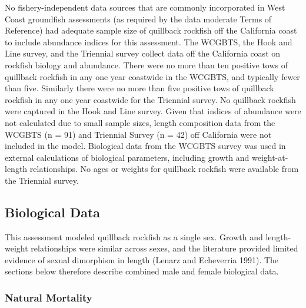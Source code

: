 \documentclass[11pt,
  english,
  a4paper,
]{article}
\begin{document}
No fishery-independent data sources that are commonly incorporated in West Coast groundfish assessments (as required by the data moderate Terms of Reference) had adequate sample size of quillback rockfish off the California coast to include abundance indices for this assessment. The WCGBTS, the Hook and Line survey, and the Triennial survey collect data off the California coast on rockfish biology and abundance. There were no more than ten positive tows of quillback rockfish in any one year coastwide in the WCGBTS, and typically fewer than five. Similarly there were no more than five positive tows of quillback rockfish in any one year coastwide for the Triennial survey. No quillback rockfish were captured in the Hook and Line survey. Given that indices of abundance were not calculated due to small sample sizes, length composition data from the WCGBTS (n = 91) and Triennial Survey (n = 42) off California were not included in the model. Biological data from the WCGBTS survey was used in external calculations of biological parameters, including growth and weight-at-length relationships. No ages or weights for quillback rockfish were available from the Triennial survey.

\leavevmode\tagmcend\tagstructend\par


\hypertarget{biological-data}{%
\subsection{Biological Data}\label{biological-data}}

\leavevmode\tagmcend\tagstructend


This assessment modeled quillback rockfish as a single sex. Growth and length-weight relationships were similar across sexes, and the literature provided limited evidence of sexual dimorphism in length {(Lenarz and Echeverria 1991)\leavevmode\tagmcend\tagstructend}. The sections below therefore describe combined male and female biological data.

\leavevmode\tagmcend\tagstructend\par


\hypertarget{natural-mortality}{%
\subsubsection{Natural Mortality}\label{natural-mortality}}
\end{document}

